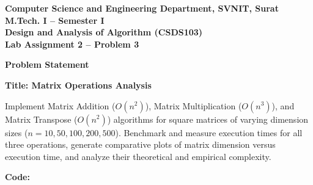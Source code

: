 \documentclass[12pt]{article}
\begin{document}
\newpage


\begin{center}
\textbf{Computer Science and Engineering Department, SVNIT, Surat}\\
\textbf{M.Tech. I -- Semester I}\\
\textbf{Design and Analysis of Algorithm (CSDS103)}\\
\textbf{Lab Assignment 2 -- Problem 3}
\end{center}

\vspace{0.4cm}

\textbf{Problem Statement}

\textbf{Title: Matrix Operations Analysis}

Implement Matrix Addition ($O(n^2)$), Matrix Multiplication ($O(n^3)$), and Matrix Transpose ($O(n^2)$) algorithms for square matrices of varying dimension sizes ($n = 10, 50, 100, 200, 500$). Benchmark and measure execution times for all three operations, generate comparative plots of matrix dimension versus execution time, and analyze their theoretical and empirical complexity.

\vspace{0.3cm}

\textbf{Code:}
\end{document}
